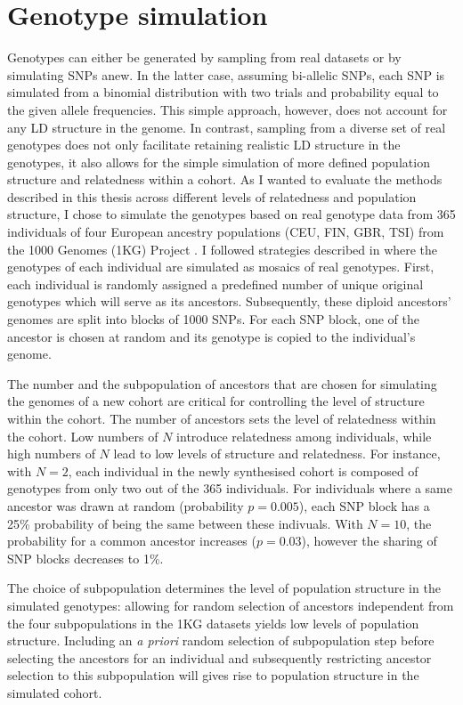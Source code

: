 \section{Genotype simulation}
\label{section:genotype-simulation}
Genotypes can either be generated by sampling from real datasets or by simulating SNPs anew. In the latter case, assuming bi-allelic SNPs, each SNP is simulated from a binomial distribution with two trials and probability equal to the given allele frequencies. This simple approach, however, does not account for any LD structure in the genome. In contrast, sampling from a diverse set of real genotypes does not only facilitate retaining realistic LD structure in the genotypes, it also allows for the simple simulation of more defined population structure and relatedness within a cohort. As I wanted to evaluate the methods described in this thesis across different levels of relatedness and population structure, 
I chose to simulate the genotypes based on real genotype data from \num{365} individuals of four European ancestry populations (CEU, FIN, GBR, TSI) from the 1000 Genomes (1KG) Project \citep{Abecasis2012}. I followed strategies described in \citep{Loh2014,Casale2015} where the genotypes of each individual are simulated as mosaics of real genotypes.  First, each individual is randomly assigned a predefined number of unique original genotypes which will serve as its ancestors. Subsequently, these diploid ancestors' genomes are split into blocks of \num{1000} SNPs. For each SNP block, one of the ancestor is chosen at random and its genotype is copied to the individual's genome. 

The number and the subpopulation of ancestors that are chosen for simulating the genomes of a new cohort are critical for controlling the level of structure within the cohort. The number of ancestors sets the level of relatedness within the cohort. Low numbers of \(N\) introduce relatedness among individuals, while high numbers of \(N\) lead to low levels of structure and relatedness.  For instance, with \(N=2\), each individual in the newly synthesised cohort is composed of genotypes from only two out of the \num{365} individuals. For individuals where a same ancestor was drawn at random (probability \(p=0.005\)), each SNP block has a \num{25}\% probability of being the same between these indivuals. With \(N=10\), the probability for a common ancestor increases (\(p=0.03\)), however the sharing of SNP blocks decreases to \num{1}\%. 

The choice of subpopulation determines the level of population structure in the simulated genotypes: allowing for random selection of ancestors independent from the four subpopulations in the 1KG datasets yields low levels of population structure. Including an \textit{a priori} random selection of subpopulation step before selecting the ancestors for an individual and subsequently restricting ancestor selection to this subpopulation will gives rise to population structure in the simulated cohort. 

